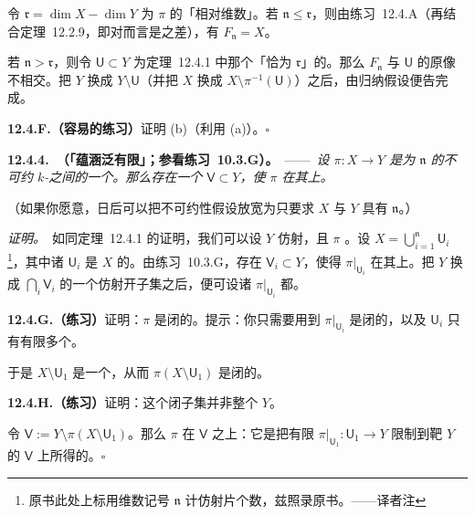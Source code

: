 令 $\mathfrak{r}=\dim X-\dim Y$ 为 $\pi$ 的「相对维数」。若 $\mathfrak{n}\le\mathfrak{r}$，则由\mbox{练习~12.4.A}（再结合定理~12.2.9，即对\trVariety{}而言\trCodimension{}是\trDimension{}之差），有 $F_{\mathfrak{n}}=X$。

若 $\mathfrak{n}>\mathfrak{r}$，则令 $\mathsf{U}\subset Y$ 为定理~12.4.1 中那个「\trFiber\trDimension{}恰为 $\mathfrak{r}$」的\trDense\trOpenSubset。那么 $F_{\mathfrak{n}}$ 与 $\mathsf{U}$ 的原像不相交。把 $Y$ 换成 $Y\setminus\mathsf{U}$（并把 $X$ 换成 $X\setminus\pi^{-1}(\mathsf{U})$）之后，由归纳假设便告完成。

\textbf{12.4.F.（容易的练习）}\quad 证明 (b)（利用 (a)）。\hfill$\square$

\textbf{12.4.4.\ \trhProposition{}（「\trGenericallyFinite{}蕴涵泛有限」；参看\mbox{练习~10.3.G}）。}\ ——\ \emph{设 $\pi\colon X\to Y$ 是\trDimension{}为 $\mathfrak{n}$ 的不可约 $k$-\trVariety{}之间的一个\trGenericallyFinite{}\trMorphism。那么存在一个\trDense\trOpenSubset{} $\mathsf{V}\subset Y$，使 $\pi$ 在其上\trFinite。}

（如果你愿意，日后可以把不可约性假设放宽为只要求 $X$ 与 $Y$ 具有\trPureDimension{} $\mathfrak{n}$。）

\emph{证明。}\ 如同定理~12.4.1 的证明，我们可以设 $Y$ 仿射，且 $\pi$ \trDominant。设 $X=\bigcup_{i=1}^{\mathfrak{n}}\mathsf{U}_i$\footnote{原书此处上标用维数记号 $\mathfrak{n}$ 计仿射片个数，兹照录原书。——译者注}，其中诸 $\mathsf{U}_i$ 是 $X$ 的\trAffine\trOpenSubscheme。由\mbox{练习~10.3.G}，存在\trDense\trOpenSubset{} $\mathsf{V}_i\subset Y$，使得 $\pi|_{\mathsf{U}_i}$ 在其上\trFinite。把 $Y$ 换成 $\bigcap_i\mathsf{V}_i$ 的一个仿射开子集之后，便可设诸 $\pi|_{\mathsf{U}_i}$ 都\trFinite。

\textbf{12.4.G.（练习）}\quad 证明：$\pi$ 是闭的。提示：你只需要用到 $\pi|_{\mathsf{U}_i}$ 是闭的，以及 $\mathsf{U}_i$ 只有有限多个。

于是 $X\setminus\mathsf{U}_1$ 是一个\trClosedSubset，从而 $\pi(X\setminus\mathsf{U}_1)$ 是闭的。

\textbf{12.4.H.（练习）}\quad 证明：这个闭子集并非整个 $Y$。

令 $\mathsf{V}:=Y\setminus\pi(X\setminus\mathsf{U}_1)$。那么 $\pi$ 在 $\mathsf{V}$ 之上\trFinite：它是把有限\trMorphism{} $\pi|_{\mathsf{U}_1}\colon\mathsf{U}_1\to Y$ 限制到靶 $Y$ 的\trOpenSubset{} $\mathsf{V}$ 上所得的\trMorphism。\hfill$\square$
